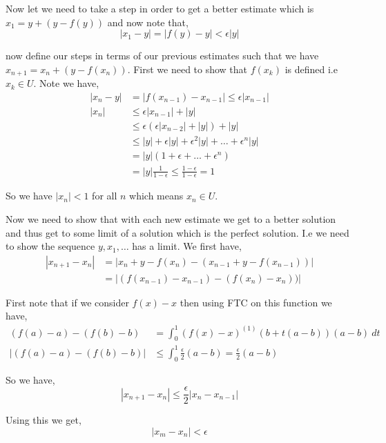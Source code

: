 \documentclass[a4paper]{article}
\begin{document}
Now let we need to take a step in order to get a better estimate which is $x_{1} = y + (y - f(y))$ and now note that, 
\[
    |x_{1} - y| = |f(y) - y| < \epsilon |y|
\]

now define our steps in terms of our previous estimates such that we have $x_{n + 1} = x_n + (y - f(x_n))$. First we need to show that $f(x_k)$ is defined i.e $x_k \in U$. Note we have, 
\begin{align*}
    |x_{n} - y| &= |f(x_{n - 1}) - x_{n - 1}| \le \epsilon |x_{n - 1}|\\
    |x_{n}| &\le \epsilon |x_{n - 1}| + |y|\\
                &\le \epsilon (\epsilon |x_{n - 2}| + |y|) + |y|\\
                &\le |y| + \epsilon |y| + \epsilon^2 |y| + \dots + \epsilon^{n} |y|\\
                &= |y| (1 + \epsilon + \dots + \epsilon^{n})\\
                &= |y| \frac{1}{1 - \epsilon} \le \frac{1 - \epsilon}{1 - \epsilon} = 1
\end{align*}

So we have $|x_n| < 1$ for all $n$ which means $x_n \in U$.


\vspace{1em}

Now we need to show that with each new estimate  we get to a better solution and thus get to some limit of a solution which is the perfect solution. I.e we need to show the sequence $y, x_{1}, \dots$ has a limit. We first have, 
\begin{align*}
    |x_{n + 1} - x_n| &= |x_n + y - f(x_n) - (x_{n - 1} + y - f(x_{n - 1}))|\\
                      &= |(f(x_{n - 1}) - x_{n - 1}) - (f(x_n) - x_n))|
\end{align*}

First note that if we consider $f(x) - x$ then using FTC on this function we have, 
\begin{align*}
    (f(a) - a) - (f(b) - b) &= \int_{0}^{1}  (f(x) - x)^{(1)}(b + t(a - b)) (a - b) \ dt\\
    |(f(a) - a) - (f(b) - b)| &\le \int_{0}^{1}  \frac{\epsilon}{2} (a - b) = \frac{\epsilon}{2} (a - b)
\end{align*}


So we have, 
\[
    |x_{n + 1} - x_n|  \le \frac{\epsilon}{2} |x_n - x_{n - 1}|
\]

Using this we get, 
\[
    |x_m - x_n| < \epsilon
\]
\end{document}
